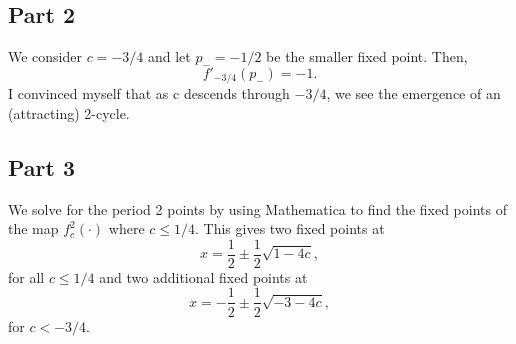 \documentclass{article}
\begin{document}
\subsection{Part 2}
We consider $c=-3/4$ and let $p_-=-1/2$ be the smaller fixed point. Then,
\[
f'_{-3/4}(p_-)=-1.
\]
I convinced myself that as c descends through
$-3/4$, we see the emergence of an (attracting) 2-cycle.

\subsection{Part 3}
We solve for the period 2 points by using Mathematica to find the fixed points of the map $f^2_c(\cdot)$ where $c\leq1/4$. This gives two fixed points 
at
\[
x=\frac{1}{2}\pm\frac{1}{2}\sqrt{1-4c},
\]
for all $c\leq1/4$ and two additional fixed points at 
\[
x=-\frac{1}{2}\pm\frac{1}{2}\sqrt{-3-4c},
\]
for $c<-3/4$.
\end{document}
